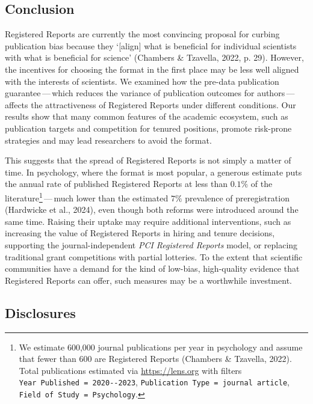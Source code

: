 \documentclass[
  british,
  a4paper,
  ,man,floatsintext]{apa6}
\begin{document}
\subsection{Conclusion}\label{conclusion}

Registered Reports are currently the most convincing proposal for curbing publication bias because they `{[}align{]} what is beneficial for individual scientists with what is beneficial for science' (Chambers \& Tzavella, 2022, p. 29).
However, the incentives for choosing the format in the first place may be less well aligned with the interests of scientists.
We examined how the pre-data publication guarantee\(\,\)---\(\,\)which reduces the variance of publication outcomes for authors\(\,\)---\(\,\)affects the attractiveness of Registered Reports under different conditions.
Our results show that many common features of the academic ecosystem, such as publication targets and competition for tenured positions, promote risk-prone strategies and may lead researchers to avoid the format.

This suggests that the spread of Registered Reports is not simply a matter of time.
In psychology, where the format is most popular, a generous estimate puts the annual rate of published Registered Reports at less than \(0.1\%\) of the literature\footnote{We estimate 600,000 journal publications per year in psychology and assume that fewer than 600 are Registered Reports (Chambers \& Tzavella, 2022). Total publications estimated via \url{https://lens.org} with filters \texttt{Year\ Published\ =\ 2020-\/-2023}, \texttt{Publication\ Type\ =\ journal\ article}, \texttt{Field\ of\ Study\ =\ Psychology}.}\(\,\)---\(\,\)much lower than the estimated \(7\%\) prevalence of preregistration (Hardwicke et al., 2024), even though both reforms were introduced around the same time.
Raising their uptake may require additional interventions, such as increasing the value of Registered Reports in hiring and tenure decisions, supporting the journal-independent \emph{PCI Registered Reports} model, or replacing traditional grant competitions with partial lotteries.
To the extent that scientific communities have a demand for the kind of low-bias, high-quality evidence that Registered Reports can offer, such measures may be a worthwhile investment.

\subsection{Disclosures}\label{disclosures}
\end{document}
